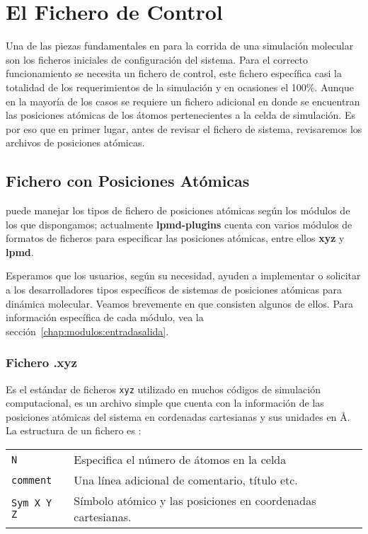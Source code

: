 \chapter{El Fichero de Control}
\label{chap:input}

Una de las piezas fundamentales en \lpmd para la corrida de una simulaci\'on molecular son los ficheros iniciales de configuraci\'on del sistema. Para el correcto funcionamiento se necesita un fichero de control, este fichero espec\'ifica casi la totalidad de los requerimientos de la simulaci\'on y en ocasiones el 100\%. Aunque en la mayor\'ia de los casos se requiere un fichero adicional en donde se encuentran las posiciones at\'omicas de los \'atomos pertenecientes a la celda de simulaci\'on. Es por eso que en primer lugar, antes de revisar el fichero de sistema, revisaremos los archivos de posiciones at\'omicas.

\section{Fichero con Posiciones At\'omicas}

\lpmd puede manejar los tipos de fichero de posiciones at\'omicas seg\'un los m\'odulos de los que dispongamos; actualmente \textbf{lpmd-plugins} cuenta con varios m\'odulos de formatos de ficheros para especificar las posiciones at\'omicas, entre ellos \textbf{xyz} y \textbf{lpmd}.

Esperamos que los usuarios, seg\'un su necesidad, ayuden a implementar o solicitar a los desarrolladores tipos espec\'ificos de sistemas de posiciones at\'omicas para din\'amica molecular. Veamos brevemente en que consisten algunos de ellos. Para informaci\'on espec\'ifica de cada m\'odulo, vea la secci\'on~\ref{chap:modulos:entradasalida}.

\subsection{Fichero .xyz}

Es el est\'andar de ficheros \verb|xyz| utilizado en muchos c\'odigos de simulaci\'on computacional, es un archivo simple que cuenta con la informaci\'on de las posiciones at\'omicas del sistema en cordenadas cartesianas y sus unidades en \AA. La estructura de un fichero es :
\begin{center}
\begin{tabular}{l|l}
 \verb|N| & Especifica el n\'umero de \'atomos en la celda \\
 \verb|comment| & Una l\'inea adicional de comentario, t\'itulo etc. \\
 \verb|Sym X Y Z| & S\'imbolo at\'omico y las posiciones en coordenadas cartesianas. \\
\end{tabular}
\end{center}

